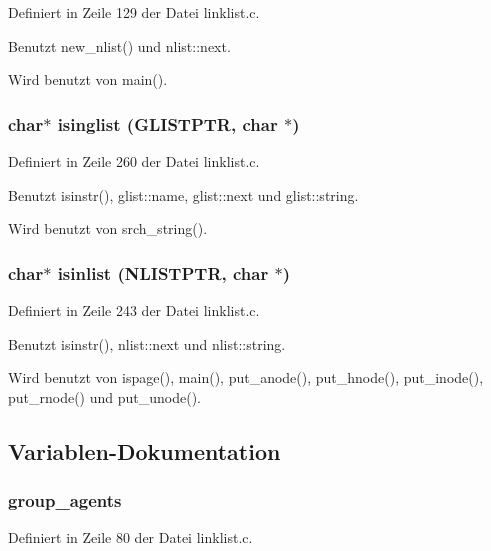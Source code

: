 Definiert in Zeile 129 der Datei linklist.c.

Benutzt new\_\-nlist() und nlist::next.

Wird benutzt von main().
\subsubsection{\setlength{\rightskip}{0pt plus 5cm}char$\ast$ isinglist ({\bf GLISTPTR}, char $\ast$)}\label{linklist_8h_04dff50c01cd9572b6a3d9dfbdb7cc07}




Definiert in Zeile 260 der Datei linklist.c.

Benutzt isinstr(), glist::name, glist::next und glist::string.

Wird benutzt von srch\_\-string().
\subsubsection{\setlength{\rightskip}{0pt plus 5cm}char$\ast$ isinlist ({\bf NLISTPTR}, char $\ast$)}\label{linklist_8h_3568dfb8e887fc7a6c38ca8f900c721c}




Definiert in Zeile 243 der Datei linklist.c.

Benutzt isinstr(), nlist::next und nlist::string.

Wird benutzt von ispage(), main(), put\_\-anode(), put\_\-hnode(), put\_\-inode(), put\_\-rnode() und put\_\-unode().

\subsection{Variablen-Dokumentation}
\subsubsection{ {\bf group\_\-agents}}\label{linklist_8h_2acbebab9914d67a3cea0f3716324fe2}




Definiert in Zeile 80 der Datei linklist.c.
